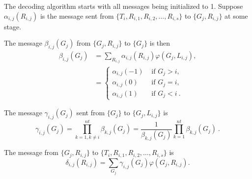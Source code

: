 The decoding algorithm starts with all messages being  initialized
to 1. Suppose $\alpha_{i,j}(R_{i,j})$ is the message sent from
$\{T_i, R_{i,1},R_{i,2},\dots, R_{i,s}\}$ to $\{G_j,R_{i,j}\}$ at
some stage.

The message $\beta_{i,j}(G_j)$ from $\{G_j,R_{i,j}\}$ to $\{G_j\}$
is then
\begin{eqnarray*}
\beta_{i,j}(G_j)&=\sum_{R_{i,j}}\alpha_{i,j}(R_{i,j})\varphi
(G_j,L_{i,j}),\\
{}&=\left\{ \begin{array}{ccc}\alpha_{i,j}(-1) & \text{ if }
G_j>i,\\
\alpha_{i,j}(0) & \text{ if }
G_j=i,\\
\alpha_{i,j}(1) & \text{ if } G_j<i~.
\end{array}\right.
\end{eqnarray*}

The message $\gamma_{i,j}(G_j)$ sent from $\{G_j\}$ to
$\{G_j,L_{i,j}\}$ is
\begin{equation}
\gamma_{i,j}(G_j)=\prod_{k=1,k\neq
i}^{nt}\beta_{k,j}(G_j)=\frac{1}{\beta_{k,j}(G_j)}\prod_{k=1}^{nt}\beta_{k,j}(G_j)~.
\end{equation}

The message from $\{G_j,R_{i,j}\}$ to $\{T_i, R_{i,1},R_{i,2},\dots,
R_{i,s}\}$  is
\begin{equation}
\delta_{i,j}(R_{i,j})=\sum_{G_j}\gamma_{i,j}(G_j)\varphi(G_j,R_{i,j}).
\end{equation}

